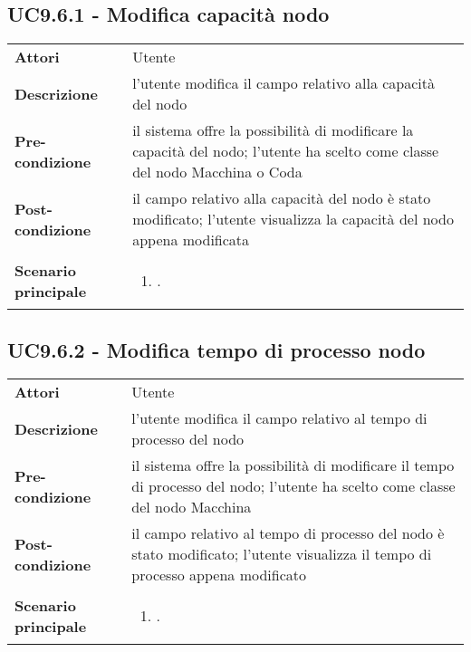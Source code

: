 \subsection{UC9.6.1 - Modifica capacità nodo} 
\label{sssec:UC9.6.1} 
\def\arraystretch{1.5}
\begin{tabularx}{\textwidth}{l|p{}}
	\rowcolor{I} \multicolumn{2}{c}{\color{white}\textbf{UC9.6.1 - Modifica capacità nodo}} \\
	\toprule
	\endhead
	\textbf{Attori} & Utente\\
	\textbf{Descrizione} & l'utente modifica il campo relativo alla capacità del nodo\\
	\textbf{Pre-condizione} & il sistema offre la possibilità di modificare la capacità del nodo; l'utente ha scelto come classe del nodo Macchina o Coda\\
	\textbf{Post-condizione} & il campo relativo alla capacità del nodo è stato modificato; l'utente visualizza la capacità del nodo appena modificata\\
	\textbf{Scenario principale} & \vspace{-1.2em}\begin{enumerate}[leftmargin=*,noitemsep,nosep]
		\item \nameref{sssec:UC9.6.1}.
	\end{enumerate}\\
	\bottomrule
\end{tabularx}
\subsection{UC9.6.2 - Modifica tempo di processo nodo} 
\label{sssec:UC9.6.2} 
\def\arraystretch{1.5}
\begin{tabularx}{\textwidth}{l|p{}}
	\rowcolor{I} \multicolumn{2}{c}{\color{white}\textbf{UC9.6.2 - Modifica tempo di processo nodo}} \\
	\toprule
	\endhead
	\textbf{Attori} & Utente\\
	\textbf{Descrizione} & l'utente modifica il campo relativo al tempo di processo del nodo\\
	\textbf{Pre-condizione} & il sistema offre la possibilità di modificare il tempo di processo del nodo; l'utente ha scelto come classe del nodo Macchina\\
	\textbf{Post-condizione} & il campo relativo al tempo di processo del nodo è stato modificato; l'utente visualizza il tempo di processo appena modificato\\
	\textbf{Scenario principale} & \vspace{-1.2em}\begin{enumerate}[leftmargin=*,noitemsep,nosep]
		\item \nameref{sssec:UC9.6.2}.
	\end{enumerate}\\
	\bottomrule
\end{tabularx}
